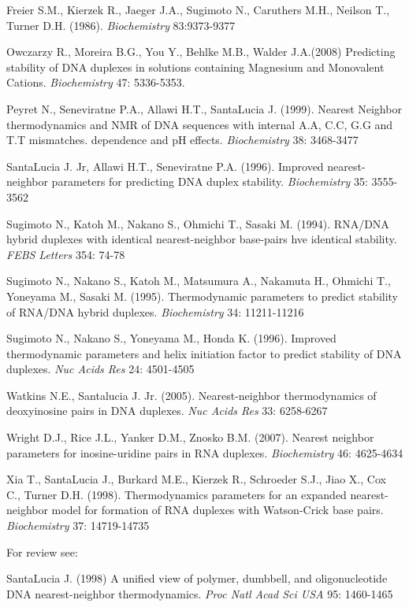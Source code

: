 \documentclass{article}
\begin{document}
  Freier S.M., Kierzek R., Jaeger 
J.A., Sugimoto N., Caruthers M.H., Neilson T., Turner D.H. (1986). \textit{Biochemistry} 
 83:9373-9377 
 
 Owczarzy R., Moreira B.G., You Y., Behlke M.B., Walder J.A.(2008) Predicting stability of DNA duplexes 
 in solutions containing Magnesium and Monovalent Cations. \textit{Biochemistry} 47: 5336-5353.  

Peyret N., Seneviratne P.A., Allawi H.T., SantaLucia J. (1999). Nearest Neighbor thermodynamics and 
NMR of DNA sequences with internal A.A, C.C, G.G and T.T mismatches. dependence and pH effects.
\textit{Biochemistry} 38: 3468-3477

  SantaLucia J. Jr, Allawi H.T., Seneviratne P.A. (1996). Improved 
nearest-neighbor parameters for predicting DNA duplex stability. \textit{Biochemistry} 
35: 3555-3562   

  Sugimoto N., Katoh M., Nakano S., Ohmichi T., Sasaki M. (1994). 
RNA/DNA hybrid duplexes with identical nearest-neighbor base-pairs hve identical 
stability. \textit{FEBS Letters} 354: 74-78   

  Sugimoto N., Nakano S., Katoh M., Matsumura 
A., Nakamuta H., Ohmichi T., Yoneyama M., Sasaki M. (1995). Thermodynamic parameters 
to predict stability of RNA/DNA hybrid duplexes. \textit{Biochemistry} 34: 11211-11216 
  
  Sugimoto N., Nakano S., Yoneyama M., Honda K. (1996).  Improved thermodynamic 
parameters and helix initiation factor to predict stability of DNA duplexes. 
\textit{Nuc Acids Res}  24: 4501-4505  

Watkins N.E., Santalucia J. Jr. (2005). Nearest-neighbor thermodynamics of deoxyinosine 
pairs in DNA duplexes. \textit{Nuc Acids Res} 33: 6258-6267 

Wright D.J., Rice J.L., Yanker D.M., Znosko B.M. (2007). Nearest neighbor parameters for 
inosine-uridine pairs in RNA duplexes. \textit{Biochemistry} 46: 4625-4634

  Xia T., SantaLucia J., Burkard M.E., Kierzek 
R., Schroeder S.J., Jiao X., Cox C., Turner D.H. (1998). Thermodynamics parameters 
for an expanded nearest-neighbor model for formation of RNA duplexes with 
Watson-Crick base pairs. \textit{Biochemistry}  37: 14719-14735   

  For review see: 
  
  SantaLucia J. (1998) A unified view of polymer, dumbbell, and oligonucleotide 
DNA nearest-neighbor thermodynamics. \textit{Proc Natl Acad Sci USA}  95: 1460-1465 
\end{document}
